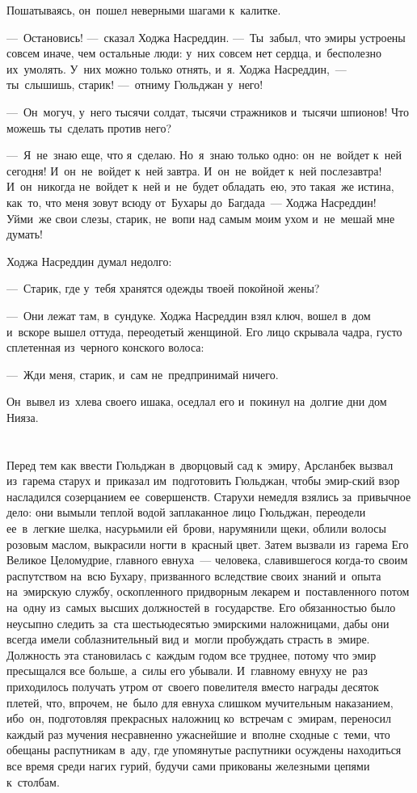 \documentclass[12pt,a4paper]{book}
\begin{document}
Пошатываясь, он~пошел неверными шагами к~калитке.

—~Остановись! —~сказал Ходжа Насреддин. —~Ты~забыл, что эмиры устроены совсем иначе, чем остальные люди: у~них совсем нет сердца, и~бесполезно их~умолять. У~них можно только отнять, и~я. Ходжа Насреддин,~— ты~слышишь, старик! —~отниму Гюльджан у~него!

—~Он~могуч, у~него тысячи солдат, тысячи стражников и~тысячи шпионов! Что можешь ты~сделать против него?

—~Я~не~знаю еще, что я~сделаю. Но~я~знаю только одно: он~не~войдет к~ней сегодня! И~он~не~войдет к~ней завтра. И~он~не~войдет к~ней послезавтра! И~он~никогда не~войдет к~ней и~не~будет обладать~ею, это такая~же истина, как~то, что меня зовут всюду от~Бухары до~Багдада~— Ходжа Насреддин! Уйми~же свои слезы, старик, не~вопи над самым моим ухом и~не~мешай мне думать!

Ходжа Насреддин думал недолго:

—~Старик, где у~тебя хранятся одежды твоей покойной жены?

—~Они лежат там, в~сундуке. Ходжа Насреддин взял ключ, вошел в~дом и~вскоре вышел оттуда, переодетый женщиной. Его лицо скрывала чадра, густо сплетенная из~черного конского волоса:

—~Жди меня, старик, и~сам не~предпринимай ничего.

Он~вывел из~хлева своего ишака, оседлал его и~покинул на~долгие дни дом Нияза.


\chapter{}

Перед тем как ввести Гюльджан в~дворцовый сад к~эмиру, Арсланбек вызвал из~гарема старух и~приказал им~подготовить Гюльджан, чтобы эмир-ский взор насладился созерцанием ее~совершенств. Старухи немедля взялись за~привычное дело: они вымыли теплой водой заплаканное лицо Гюльджан, переодели ее~в~легкие шелка, насурьмили ей~брови, нарумянили щеки, облили волосы розовым маслом, выкрасили ногти в~красный цвет. Затем вызвали из~гарема Его Великое Целомудрие, главного евнуха~— человека, славившегося когда-то своим распутством на~всю Бухару, призванного вследствие своих знаний и~опыта на~эмирскую службу, оскопленного придворным лекарем и~поставленного потом на~одну из~самых высших должностей в~государстве. Его обязанностью было неусыпно следить за~ста шестьюдесятью эмирскими наложницами, дабы они всегда имели соблазнительный вид и~могли пробуждать страсть в~эмире. Должность эта становилась с~каждым годом все труднее, потому что эмир пресыщался все больше, а~силы его убывали. И~главному евнуху не~раз приходилось получать утром от~своего повелителя вместо награды десяток плетей, что, впрочем, не~было для евнуха слишком мучительным наказанием, ибо~он, подготовляя прекрасных наложниц ко~встречам с~эмирам, переносил каждый раз мучения несравненно ужаснейшие и~вполне сходные с~теми, что обещаны распутникам в~аду, где упомянутые распутники осуждены находиться все время среди нагих гурий, будучи сами прикованы железными цепями к~столбам.
\end{document}
